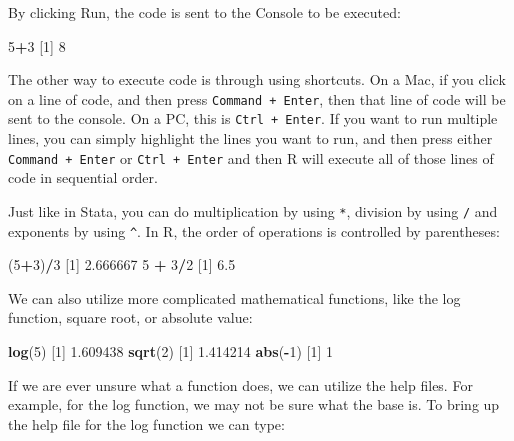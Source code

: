 \documentclass[
]{book}
\newenvironment{Shaded}{\begin{snugshade}}{\end{snugshade}}
\newcommand{\DecValTok}[1]{\textcolor[rgb]{0.00,0.00,0.81}{#1}}
\newcommand{\FloatTok}[1]{\textcolor[rgb]{0.00,0.00,0.81}{#1}}
\newcommand{\FunctionTok}[1]{\textcolor[rgb]{0.13,0.29,0.53}{\textbf{#1}}}
\newcommand{\NormalTok}[1]{#1}
\newcommand{\SpecialCharTok}[1]{\textcolor[rgb]{0.81,0.36,0.00}{\textbf{#1}}}
\begin{document}
By clicking Run, the code is sent to the Console to be executed:

\begin{Shaded}
\begin{Highlighting}[]
\DecValTok{5}\SpecialCharTok{+}\DecValTok{3}
\NormalTok{[}\DecValTok{1}\NormalTok{] }\DecValTok{8}
\end{Highlighting}
\end{Shaded}

The other way to execute code is through using shortcuts. On a Mac, if you click on a line of code, and then press \texttt{Command\ +\ Enter}, then that line of code will be sent to the console. On a PC, this is \texttt{Ctrl\ +\ Enter}. If you want to run multiple lines, you can simply highlight the lines you want to run, and then press either \texttt{Command\ +\ Enter} or \texttt{Ctrl\ +\ Enter} and then R will execute all of those lines of code in sequential order.

Just like in Stata, you can do multiplication by using \texttt{*}, division by using \texttt{/} and exponents by using \texttt{\^{}}. In R, the order of operations is controlled by parentheses:

\begin{Shaded}
\begin{Highlighting}[]
\NormalTok{(}\DecValTok{5}\SpecialCharTok{+}\DecValTok{3}\NormalTok{)}\SpecialCharTok{/}\DecValTok{3}
\NormalTok{[}\DecValTok{1}\NormalTok{] }\FloatTok{2.666667}
\DecValTok{5} \SpecialCharTok{+} \DecValTok{3}\SpecialCharTok{/}\DecValTok{2}
\NormalTok{[}\DecValTok{1}\NormalTok{] }\FloatTok{6.5}
\end{Highlighting}
\end{Shaded}

We can also utilize more complicated mathematical functions, like the log function, square root, or absolute value:

\begin{Shaded}
\begin{Highlighting}[]
\FunctionTok{log}\NormalTok{(}\DecValTok{5}\NormalTok{)}
\NormalTok{[}\DecValTok{1}\NormalTok{] }\FloatTok{1.609438}
\FunctionTok{sqrt}\NormalTok{(}\DecValTok{2}\NormalTok{)}
\NormalTok{[}\DecValTok{1}\NormalTok{] }\FloatTok{1.414214}
\FunctionTok{abs}\NormalTok{(}\SpecialCharTok{{-}}\DecValTok{1}\NormalTok{)}
\NormalTok{[}\DecValTok{1}\NormalTok{] }\DecValTok{1}
\end{Highlighting}
\end{Shaded}

If we are ever unsure what a function does, we can utilize the help files. For example, for the log function, we may not be sure what the base is. To bring up the help file for the log function we can type:
\end{document}
